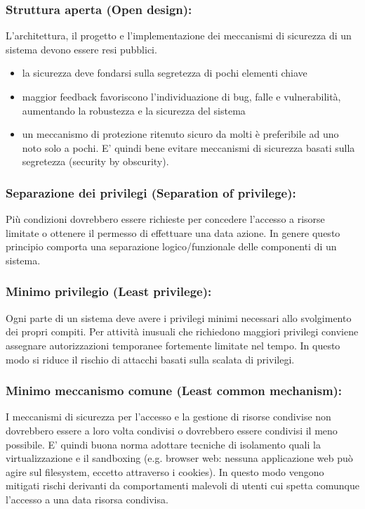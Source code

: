 \subsubsection{Struttura aperta (Open design):} \label{sec:openStruct}  L’architettura, il progetto e l'implementazione dei meccanismi di sicurezza di un sistema devono essere resi pubblici.
\begin{itemize} 
  \item la sicurezza deve fondarsi sulla segretezza di pochi elementi chiave
  \item maggior feedback favoriscono l’individuazione di bug, falle e vulnerabilità, aumentando la robustezza e la sicurezza del sistema
  \item un meccanismo di protezione ritenuto sicuro da molti è preferibile ad uno noto solo a pochi. E' quindi bene evitare meccanismi di sicurezza basati sulla segretezza (security by obscurity).
\end{itemize}


\subsubsection{Separazione dei privilegi (Separation of privilege):} Più condizioni dovrebbero essere richieste per concedere l’accesso a risorse limitate o ottenere il permesso di effettuare una data azione. In genere questo principio comporta una separazione logico/funzionale delle componenti di un sistema.

\subsubsection{Minimo privilegio (Least privilege):} Ogni parte di un sistema deve avere i privilegi minimi necessari allo svolgimento dei propri compiti. Per attività inusuali che richiedono maggiori privilegi conviene assegnare autorizzazioni temporanee fortemente limitate nel tempo. In questo modo si riduce il rischio di attacchi basati sulla scalata di privilegi.

\subsubsection{Minimo meccanismo comune (Least common mechanism):} I meccanismi di sicurezza per l’accesso e la gestione di risorse condivise non dovrebbero essere a loro volta condivisi o dovrebbero essere condivisi il meno possibile. E' quindi buona norma adottare tecniche di isolamento quali la virtualizzazione e il sandboxing (e.g. browser web: nessuna applicazione web può agire sul filesystem, eccetto attraverso i cookies). In questo modo vengono mitigati rischi derivanti da comportamenti malevoli di utenti cui spetta comunque l’accesso a una data risorsa condivisa.

